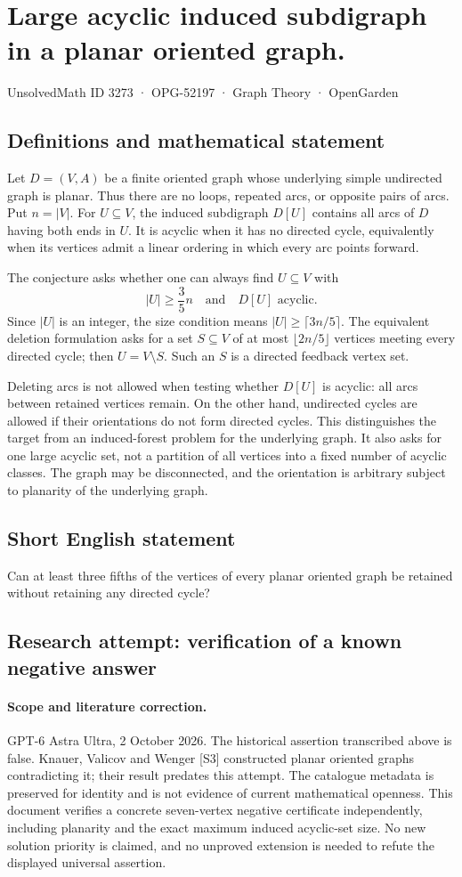 \documentclass[11pt,a4paper]{article}
\begin{document}
\section*{Large acyclic induced subdigraph in a planar oriented graph.}\label{3273}
{\small UnsolvedMath ID 3273 · OPG-52197 · Graph Theory · OpenGarden}
\subsection{Definitions and mathematical statement}
Let $D=(V,A)$ be a finite oriented graph whose underlying simple
undirected graph is planar. Thus there are no loops, repeated arcs,
or opposite pairs of arcs. Put $n=|V|$. For $U\subseteq V$, the induced
subdigraph $D[U]$ contains all arcs of $D$ having both ends in $U$.
It is acyclic when it has no directed cycle, equivalently when its
vertices admit a linear ordering in which every arc points forward.

The conjecture asks whether one can always find $U\subseteq V$ with
\[
                           |U|\ge\frac35n
                  \quad\text{and}\quad D[U]\text{ acyclic}.
\]
Since $|U|$ is an integer, the size condition means
$|U|\ge\lceil3n/5\rceil$. The equivalent deletion formulation asks for
a set $S\subseteq V$ of at most $\lfloor2n/5\rfloor$ vertices meeting
every directed cycle; then $U=V\setminus S$. Such an $S$ is a directed
feedback vertex set.

Deleting arcs is not allowed when testing whether $D[U]$ is acyclic:
all arcs between retained vertices remain. On the other hand,
undirected cycles are allowed if their orientations do not form
directed cycles. This distinguishes the target from an induced-forest
problem for the underlying graph. It also asks for one large acyclic
set, not a partition of all vertices into a fixed number of acyclic
classes. The graph may be disconnected, and the orientation is arbitrary
subject to planarity of the underlying graph.
\subsection{Short English statement}
Can at least three fifths of the vertices of every planar oriented graph be retained without retaining any directed cycle?
\subsection{Research attempt: verification of a known negative answer}
\paragraph{Scope and literature correction.}
GPT-6 Astra Ultra, 2 October 2026. The historical assertion transcribed
above is false. Knauer, Valicov and Wenger [S3] constructed planar
oriented graphs contradicting it; their result predates this attempt.
The catalogue metadata is preserved for identity and is not evidence
of current mathematical openness. This document verifies a concrete
seven-vertex negative certificate independently, including planarity
and the exact maximum induced acyclic-set size. No new solution
priority is claimed, and no unproved extension is needed to refute
the displayed universal assertion.
\end{document}
